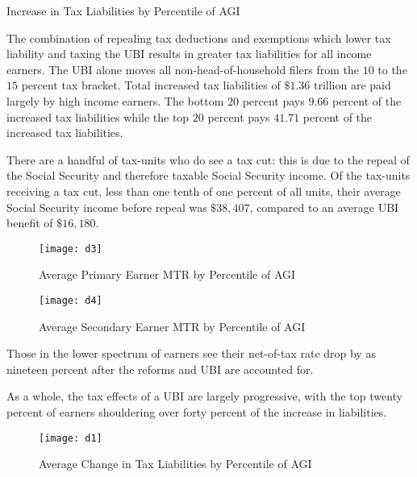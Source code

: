 \documentclass{article}
\begin{document}
\begin{table}[H]
\caption{Increase in Tax Liabilities by Percentile of AGI}
\label{table:d1}
\begin{center}
\begin{adjustbox}{max width=\textwidth}

\end{adjustbox}
\end{center}
\end{table}

The combination of repealing tax deductions and exemptions which lower tax liability and taxing the UBI results in greater tax liabilities for all income earners. The UBI alone moves all non-head-of-household filers from the $10$ to the $15$ percent tax bracket. Total increased tax liabilities of $\$1.36$ trillion are paid largely by high income earners. The bottom $20$ percent pays $9.66$ percent of the increased tax liabilities while the top $20$ percent pays $41.71$ percent of the increased tax liabilities. 

There are a handful of tax-units who do see a tax cut: this is due to the repeal of the Social Security and therefore taxable Social Security income. Of the tax-units receiving a tax cut, less than one tenth of one percent of all units, their average Social Security income before repeal was $\$38,407$, compared to an average UBI benefit of $\$16,180$.


\begin{figure}[H]
\centering
\caption{Average Primary Earner MTR by Percentile of AGI}
\texttt{[image: d3]}
\end{figure}

\begin{figure}[H]
\centering
\caption{Average Secondary Earner MTR by Percentile of AGI}
\texttt{[image: d4]}
\end{figure}

Those in the lower spectrum of earners see their net-of-tax rate drop by as nineteen percent after the reforms and UBI are accounted for.

As a whole, the tax effects of a UBI are largely progressive, with the top twenty percent of earners shouldering over forty percent of the increase in liabilities.

\begin{figure}[H]
\centering
\caption{Average Change in Tax Liabilities by Percentile of AGI}
\texttt{[image: d1]}
\end{figure}
\end{document}
